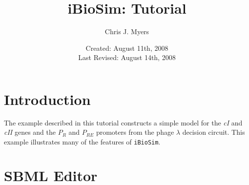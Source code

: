 \documentclass[titlepage,11pt]{article}
\title{iBioSim: Tutorial}
\author{Chris J. Myers}
\date{Created: August 11th, 2008\\
  Last Revised: August 14th, 2008
}
\begin{document}
\maketitle

  
\tableofcontents

\clearpage
  

\section{Introduction}

The example described in this tutorial constructs a simple model for
the \emph{cI} and \emph{cII} genes and the $P_R$ and $P_{RE}$
promoters from the phage $\lambda$ decision circuit.  This example
illustrates many of the features of {\tt iBioSim}.


\section{SBML Editor}
\end{document}
